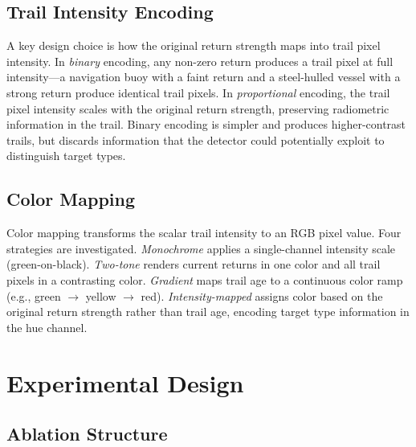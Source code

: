 \documentclass[colorlinks,upint,balance]{asmeconf}
\begin{document}
\subsection{Trail Intensity Encoding}

A key design choice is how the original return strength maps into trail pixel intensity. In \textit{binary} encoding, any non-zero return produces a trail pixel at full intensity---a navigation buoy with a faint return and a steel-hulled vessel with a strong return produce identical trail pixels. In \textit{proportional} encoding, the trail pixel intensity scales with the original return strength, preserving radiometric information in the trail. Binary encoding is simpler and produces higher-contrast trails, but discards information that the detector could potentially exploit to distinguish target types.

\subsection{Color Mapping}

Color mapping transforms the scalar trail intensity to an RGB pixel value. Four strategies are investigated. \textit{Monochrome} applies a single-channel intensity scale (green-on-black). \textit{Two-tone} renders current returns in one color and all trail pixels in a contrasting color. \textit{Gradient} maps trail age to a continuous color ramp (e.g., green $\rightarrow$ yellow $\rightarrow$ red). \textit{Intensity-mapped} assigns color based on the original return strength rather than trail age, encoding target type information in the hue channel.


\section{Experimental Design}

\subsection{Ablation Structure}
\end{document}
